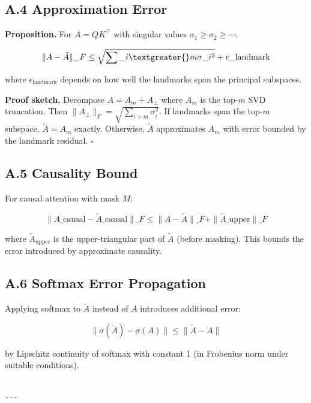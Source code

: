 \subsection{A.4 Approximation Error}

\textbf{Proposition.} For $A = QK^\top$ with singular values $\sigma_1 \ge \sigma_2 \ge \cdots$:

\[
\|A - \tilde{A}\|\_F \leq \sqrt{\sum\_{i \textgreater{} m} \sigma\_i^2} + \epsilon\_\text{landmark}
\]

where $\epsilon_\text{landmark}$ depends on how well the landmarks span the 
principal subspaces.

\textbf{Proof sketch.} Decompose $A = A_m + A_\perp$ where $A_m$ is the top-$m$ 
SVD truncation. Then $\|A_\perp\|_F = \sqrt{\sum_{i>m} \sigma_i^2}$. If 
landmarks span the top-$m$ subspace, $\tilde{A} = A_m$ exactly. Otherwise, 
$\tilde{A}$ approximates $A_m$ with error bounded by the landmark residual. 
$\square$

\subsection{A.5 Causality Bound}

For causal attention with mask $M$:

\[
\|A\_\text{causal} - \tilde{A}\_\text{causal}\|\_F \leq \|A - \tilde{A}\|\_F + \|\tilde{A}\_\text{upper}\|\_F
\]

where $\tilde{A}_\text{upper}$ is the upper-triangular part of $\tilde{A}$ 
(before masking). This bounds the error introduced by approximate causality.

\subsection{A.6 Softmax Error Propagation}

Applying softmax to $\tilde{A}$ instead of $A$ introduces additional error:

\[
\|\sigma(\tilde{A}) - \sigma(A)\| \le \|\tilde{A} - A\|
\]

by Lipschitz continuity of softmax with constant 1 (in Frobenius norm under 
suitable conditions).
\begin{lstlisting}

---
\end{lstlisting}